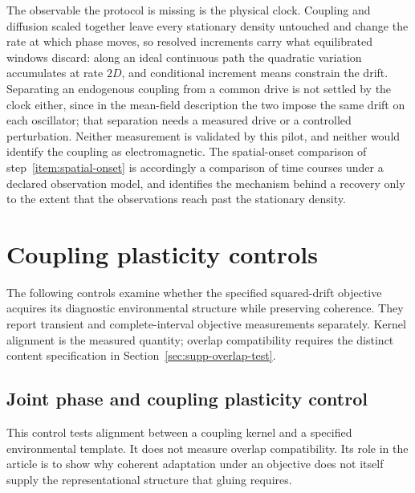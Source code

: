 \documentclass{article}
\begin{document}
The observable the protocol is missing is the physical clock. Coupling and
diffusion scaled together leave every stationary density untouched and change
the rate at which phase moves, so resolved increments carry what equilibrated
windows discard: along an ideal continuous path the quadratic variation
accumulates at rate $2D$, and conditional increment means constrain the drift.
Separating an endogenous coupling from a common drive is not settled by the
clock either, since in the mean-field description the two impose the same drift
on each oscillator; that separation needs a measured drive or a controlled
perturbation. Neither measurement is validated by this pilot, and neither would
identify the coupling as electromagnetic. The spatial-onset comparison of step~\ref{item:spatial-onset} is
accordingly a comparison of time courses under a declared observation model,
and identifies the mechanism behind a recovery only to the extent that the
observations reach past the stationary density.

\section{Coupling plasticity controls}
\label{sec:supp-plasticity}

The following controls examine whether the specified squared-drift objective acquires its diagnostic environmental structure while preserving coherence. They report transient and complete-interval objective measurements separately. Kernel alignment is the measured quantity; overlap compatibility requires the distinct content specification in Section~\ref{sec:supp-overlap-test}.

\subsection{Joint phase and coupling plasticity control}

This control tests alignment between a coupling kernel and a specified environmental template. It does not measure overlap compatibility. Its role in the article is to show why coherent adaptation under an objective does not itself supply the representational structure that gluing requires.
\end{document}
